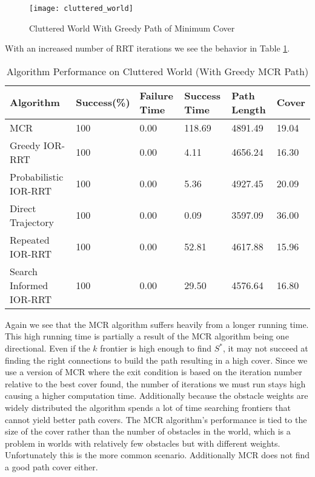 \begin{figure}[h!]
    \centering
    \texttt{[image: cluttered\_world]}
    \caption{Cluttered World With Greedy Path of Minimum Cover}
    \label{fig:cluttered_world}
\end{figure}
With an increased number of RRT iterations we see the behavior in Table \ref{tab:cluttered_world}. 

\begin{table}
\begin{tabular}{@{}llllll@{}}
\toprule
Algorithm & Success(\%)  & Failure Time  & Success Time  & Path Length & Cover\\ 
\midrule
MCR & 100 & 0.00 & 118.69 & 4891.49 & 19.04 \\
Greedy IOR-RRT & 100 & 0.00 & 4.11 & 4656.24 & 16.30 \\
Probabilistic IOR-RRT & 100 & 0.00 & 5.36 & 4927.45 & 20.09 \\
Direct Trajectory & 100 & 0.00 & 0.09 & 3597.09 & 36.00 \\
Repeated IOR-RRT & 100 & 0.00 & 52.81 & 4617.88 & 15.96 \\
Search Informed IOR-RRT & 100 & 0.00 & 29.50 & 4576.64 & 16.80 \\
\bottomrule
\end{tabular}
\caption{Algorithm Performance on Cluttered World (With Greedy MCR Path)}
\label{tab:cluttered_world}
\end{table}

Again we see that the MCR algorithm suffers heavily from a longer running time. This high running time is partially a result of the MCR algorithm being one directional. Even if the $k$ frontier is high enough to find $S^*$, it may not succeed at finding the right connections to build the path resulting in a high cover. Since we use a version of MCR where the exit condition is based on the iteration number relative to the best cover found, the number of iterations we must run stays high causing a higher computation time. Additionally because the obstacle weights are widely distributed the algorithm spends a lot of time searching frontiers that cannot yield better path covers. The MCR algorithm's performance is tied to the size of the cover rather than the number of obstacles in the world, which is a problem in worlds with relatively few obstacles but with different weights. Unfortunately this is the more common scenario. Additionally MCR does not find a good path cover either.

